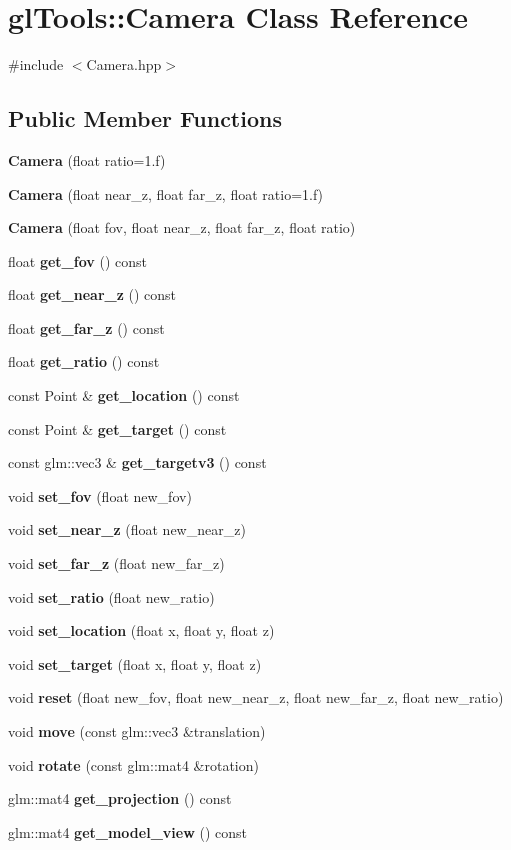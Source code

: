 \section{gl\+Tools\+::Camera Class Reference}
\label{classgl_tools_1_1_camera}


{\ttfamily \#include $<$Camera.\+hpp$>$}

\subsection*{Public Member Functions}
\begin{DoxyCompactItemize}
\item 
\textbf{ Camera} (float ratio=1.f)
\item 
\textbf{ Camera} (float near\+\_\+z, float far\+\_\+z, float ratio=1.f)
\item 
\textbf{ Camera} (float fov, float near\+\_\+z, float far\+\_\+z, float ratio)
\item 
float \textbf{ get\+\_\+fov} () const
\item 
float \textbf{ get\+\_\+near\+\_\+z} () const
\item 
float \textbf{ get\+\_\+far\+\_\+z} () const
\item 
float \textbf{ get\+\_\+ratio} () const
\item 
const Point \& \textbf{ get\+\_\+location} () const
\item 
const Point \& \textbf{ get\+\_\+target} () const
\item 
const glm\+::vec3 \& \textbf{ get\+\_\+targetv3} () const
\item 
void \textbf{ set\+\_\+fov} (float new\+\_\+fov)
\item 
void \textbf{ set\+\_\+near\+\_\+z} (float new\+\_\+near\+\_\+z)
\item 
void \textbf{ set\+\_\+far\+\_\+z} (float new\+\_\+far\+\_\+z)
\item 
void \textbf{ set\+\_\+ratio} (float new\+\_\+ratio)
\item 
void \textbf{ set\+\_\+location} (float x, float y, float z)
\item 
void \textbf{ set\+\_\+target} (float x, float y, float z)
\item 
void \textbf{ reset} (float new\+\_\+fov, float new\+\_\+near\+\_\+z, float new\+\_\+far\+\_\+z, float new\+\_\+ratio)
\item 
void \textbf{ move} (const glm\+::vec3 \&translation)
\item 
void \textbf{ rotate} (const glm\+::mat4 \&rotation)
\item 
glm\+::mat4 \textbf{ get\+\_\+projection} () const
\item 
glm\+::mat4 \textbf{ get\+\_\+model\+\_\+view} () const
\end{DoxyCompactItemize}


